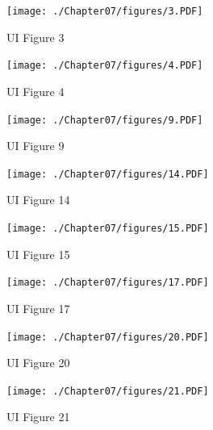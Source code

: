 \begin{figure}
    \centering
    \texttt{[image: ./Chapter07/figures/3.PDF]}
    \caption{UI Figure 3}
    \label{fig:ui-figure-3}
\end{figure}
\clearpage

\begin{figure}
    \centering
    \texttt{[image: ./Chapter07/figures/4.PDF]}
    \caption{UI Figure 4}
    \label{fig:ui-figure-4}
\end{figure}
\clearpage

\begin{figure}
    \centering
    \texttt{[image: ./Chapter07/figures/9.PDF]}
    \caption{UI Figure 9}
    \label{fig:ui-figure-9}
\end{figure}
\clearpage

\begin{figure}
    \centering
    \texttt{[image: ./Chapter07/figures/14.PDF]}
    \caption{UI Figure 14}
    \label{fig:ui-figure-14}
\end{figure}
\clearpage

\begin{figure}
    \centering
    \texttt{[image: ./Chapter07/figures/15.PDF]}
    \caption{UI Figure 15}
    \label{fig:ui-figure-15}
\end{figure}
\clearpage

\begin{figure}
    \centering
    \texttt{[image: ./Chapter07/figures/17.PDF]}
    \caption{UI Figure 17}
    \label{fig:ui-figure-17}
\end{figure}
\clearpage

\begin{figure}
    \centering
    \texttt{[image: ./Chapter07/figures/20.PDF]}
    \caption{UI Figure 20}
    \label{fig:ui-figure-20}
\end{figure}
\clearpage

\begin{figure}
    \centering
    \texttt{[image: ./Chapter07/figures/21.PDF]}
    \caption{UI Figure 21}
    \label{fig:ui-figure-21}
\end{figure}
\clearpage
